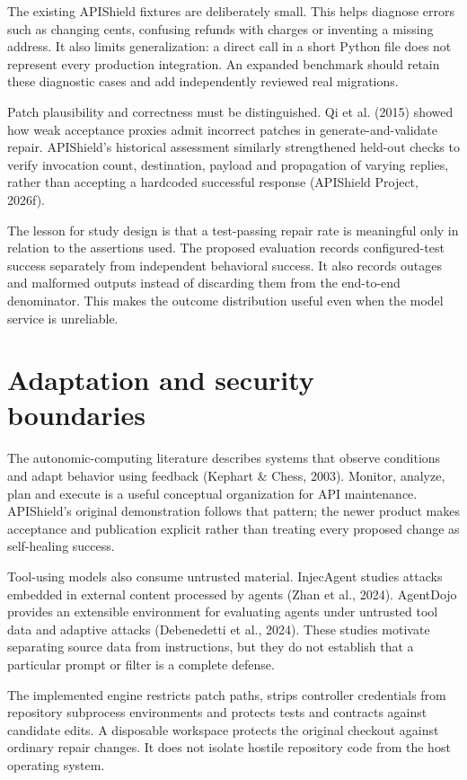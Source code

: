 \documentclass[12pt,a4paper,oneside]{report}
\begin{document}
The existing APIShield fixtures are deliberately small. This helps diagnose errors such as changing cents, confusing refunds with charges or inventing a missing address. It also limits generalization: a direct call in a short Python file does not represent every production integration. An expanded benchmark should retain these diagnostic cases and add independently reviewed real migrations.

Patch plausibility and correctness must be distinguished. Qi et al. (2015) showed how weak acceptance proxies admit incorrect patches in generate-and-validate repair. APIShield's historical assessment similarly strengthened held-out checks to verify invocation count, destination, payload and propagation of varying replies, rather than accepting a hardcoded successful response (APIShield Project, 2026f).

The lesson for study design is that a test-passing repair rate is meaningful only in relation to the assertions used. The proposed evaluation records configured-test success separately from independent behavioral success. It also records outages and malformed outputs instead of discarding them from the end-to-end denominator. This makes the outcome distribution useful even when the model service is unreliable.

\section{Adaptation and security boundaries}

The autonomic-computing literature describes systems that observe conditions and adapt behavior using feedback (Kephart \& Chess, 2003). Monitor, analyze, plan and execute is a useful conceptual organization for API maintenance. APIShield's original demonstration follows that pattern; the newer product makes acceptance and publication explicit rather than treating every proposed change as self-healing success.

Tool-using models also consume untrusted material. InjecAgent studies attacks embedded in external content processed by agents (Zhan et al., 2024). AgentDojo provides an extensible environment for evaluating agents under untrusted tool data and adaptive attacks (Debenedetti et al., 2024). These studies motivate separating source data from instructions, but they do not establish that a particular prompt or filter is a complete defense.

The implemented engine restricts patch paths, strips controller credentials from repository subprocess environments and protects tests and contracts against candidate edits. A disposable workspace protects the original checkout against ordinary repair changes. It does not isolate hostile repository code from the host operating system.
\end{document}
